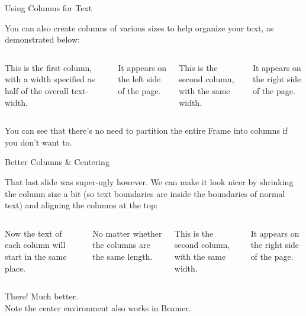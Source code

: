 \documentclass{beamer}
\begin{document}
\begin{frame}{Using Columns for Text}

	You can also create \alert{columns} of various sizes to help organize your text, as demonstrated below:
	
	\vfill
	
	\begin{columns}
		This is the first column, with a width specified as half of the overall text-width. 
		
		\medskip
		
		It appears on the left side of the page.
		
		This is the second column, with the same width.
		
		\medskip
		
		It appears on the right side of the page.
	\end{columns}

	\vfill

	You can see that there's no need to partition the entire Frame into columns if you don't want to.

\end{frame}



\begin{frame}{Better Columns \& Centering}

	That last slide was super-ugly however. We can make it look nicer by shrinking the column size a bit (so text boundaries are inside the boundaries of normal text) and aligning the columns at the \alert{top}:
	
	\vfill
	
	\begin{columns}[t]						%
		Now the text of each column will start in the same place. 
		
		\medskip
		
		No matter whether the columns are the same length.
		
		\column{0.4\textwidth}
		This is the second column, with the same width.
		
		\medskip
		
		It appears on the right side of the page.
	\end{columns}

	\vfill
	
	\begin{center}
		There! Much better.\\ Note the \alert{center} environment also works in Beamer.
	\end{center}

\end{frame}
\end{document}

